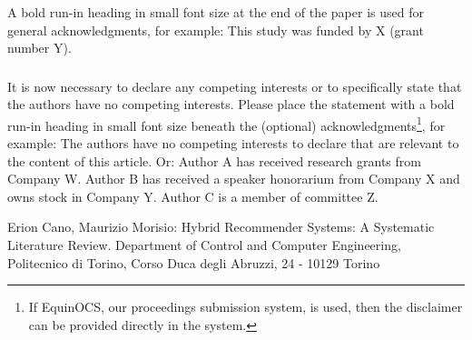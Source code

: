 \documentclass[runningheads]{llncs}
\begin{document}
\begin{credits}
\subsubsection{\ackname} A bold run-in heading in small font size at the end of the paper is
used for general acknowledgments, for example: This study was funded
by X (grant number Y).

\subsubsection{\discintname}
It is now necessary to declare any competing interests or to specifically
state that the authors have no competing interests. Please place the
statement with a bold run-in heading in small font size beneath the
(optional) acknowledgments\footnote{If EquinOCS, our proceedings submission
system, is used, then the disclaimer can be provided directly in the system.},
for example: The authors have no competing interests to declare that are
relevant to the content of this article. Or: Author A has received research
grants from Company W. Author B has received a speaker honorarium from
Company X and owns stock in Company Y. Author C is a member of committee Z.
\end{credits}
%
%
%
% 
% 
%
\begin{thebibliography}{8}
Erion Cano, Maurizio Morisio: Hybrid Recommender Systems: A Systematic Literature Review. Department of Control and Computer Engineering, Politecnico di Torino, Corso Duca degli Abruzzi, 24 - 10129 Torino

\end{thebibliography}
\end{document}

